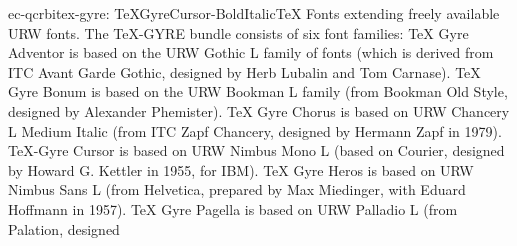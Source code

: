 \documentclass{ddltxtyp}
\begin{document}
\begin{package}{ec-qcrbi}{tex-gyre: TeXGyreCursor-BoldItalic}{{\TeX} Fonts extending freely available URW fonts.}
The {\TeX}-GYRE bundle consists of six font families: {\TeX} Gyre
Adventor is based on the URW Gothic L family of fonts (which is
derived from ITC Avant Garde Gothic, designed by Herb Lubalin
and Tom Carnase). {\TeX} Gyre Bonum is based on the URW Bookman L
family (from Bookman Old Style, designed by Alexander
Phemister). {\TeX} Gyre Chorus is based on URW Chancery L Medium
Italic (from ITC Zapf Chancery, designed by Hermann Zapf in
1979). {\TeX}-Gyre Cursor is based on URW Nimbus Mono L (based on
Courier, designed by Howard G. Kettler in 1955, for IBM). {\TeX}
Gyre Heros is based on URW Nimbus Sans L (from Helvetica,
prepared by Max Miedinger, with Eduard Hoffmann in 1957). {\TeX}
Gyre Pagella is based on URW Palladio L (from Palation,
designed %
\end{package}
\end{document}
